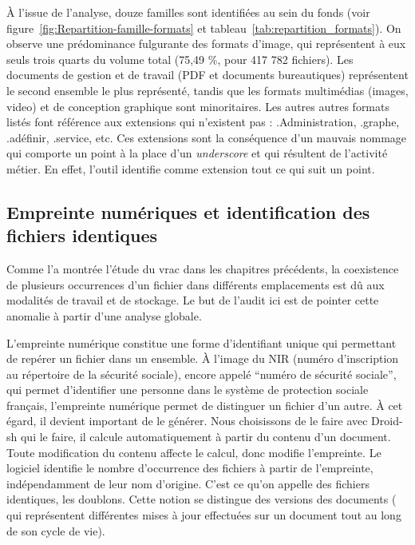 \vspace{0.5cm} %
À l'issue de l'analyse, douze familles sont identifiées au sein du fonds (voir figure~\ref{fig:Repartition-famille-formats} et tableau~\ref{tab:repartition_formats}). On observe une prédominance fulgurante des formats d'image, qui représentent à eux seuls trois quarts du volume total (75,49 \%, pour 417 782 fichiers). Les documents de gestion et de travail (PDF et documents bureautiques) représentent le second ensemble le plus représenté, tandis que les formats multimédias (images, video) et de conception graphique sont minoritaires. Les autres autres formats listés font référence aux extensions qui n'existent pas : .Administration, .graphe, .adéfinir, .service, etc. Ces extensions sont la conséquence d’un mauvais nommage qui comporte un point à la place d'un \textit{underscore} et qui résultent de l'activité métier. En effet, l'outil identifie comme extension tout ce qui suit un point. 

\subsection*{Empreinte numériques et identification des fichiers identiques}

Comme l'a montrée l'étude du vrac dans les chapitres précédents, la coexistence de plusieurs occurrences d'un fichier dans différents emplacements est dû aux modalités de travail et de stockage. Le but de l'audit ici est de pointer cette anomalie à partir d'une analyse globale.

L'empreinte numérique constitue une forme d'identifiant unique qui permettant de repérer un fichier dans un ensemble. À l'image du NIR (numéro d'inscription au répertoire de la sécurité sociale), encore appelé \enquote{numéro de sécurité sociale}, qui permet d'identifier une personne dans le système de protection sociale français, l'empreinte numérique permet de distinguer un fichier d'un autre. À cet égard, il devient important de le générer. Nous choisissons de le faire avec Droid-sh qui le faire, il calcule automatiquement à partir du contenu d'un document. Toute modification du contenu affecte le calcul, donc modifie l'empreinte. Le logiciel identifie le nombre d’occurrence des fichiers à partir de l'empreinte, indépendamment de leur nom d'origine. C'est ce qu'on appelle des fichiers identiques, les doublons. Cette notion se distingue des versions des documents ( qui représentent différentes mises à jour effectuées sur un document tout au long de son cycle de vie). 



